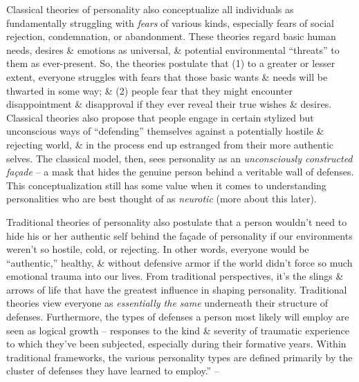 \documentclass{article}
\numberwithin{equation}{section}
\begin{document}
Classical theories of personality also conceptualize all individuals as fundamentally struggling with \textit{fears} of various kinds, especially fears of social rejection, condemnation, or abandonment. These theories regard basic human needs, desires \& emotions as universal, \& potential environmental ``threats'' to them as ever-present. So, the theories postulate that (1) to a greater or lesser extent, everyone struggles with fears that those basic wants \& needs will be thwarted in some way; \& (2) people fear that they might encounter disappointment \& disapproval if they ever reveal their true wishes \& desires. Classical theories also propose that people engage in certain stylized but unconscious ways of ``defending'' themselves against a potentially hostile \& rejecting world, \& in the process end up estranged from their more authentic selves. The classical model, then, sees personality as an \textit{unconsciously constructed fa\c{c}ade} -- a mask that hides the genuine person behind a veritable wall of defenses. This conceptualization still has some value when it comes to understanding personalities who are best thought of as \textit{neurotic} (more about this later).

Traditional theories of personality also postulate that a person wouldn't need to hide his or her authentic self behind the fa\c{c}ade of personality if our environments weren't so hostile, cold, or rejecting. In other words, everyone would be ``authentic,'' healthy, \& without defensive armor if the world didn't force so much emotional trauma into our lives. From traditional perspectives, it's the slings \& arrows of life that have the greatest influence in shaping personality. Traditional theories view everyone as \textit{essentially the same} underneath their structure of defenses. Furthermore, the types of defenses a person most likely will employ are seen as logical growth -- responses to the kind \& severity of traumatic experience to which they've been subjected, especially during their formative years. Within traditional frameworks, the various personality types are defined primarily by the cluster of defenses they have learned to employ.'' -- \cite[pp. 20--21]{Simon2011}
\end{document}
